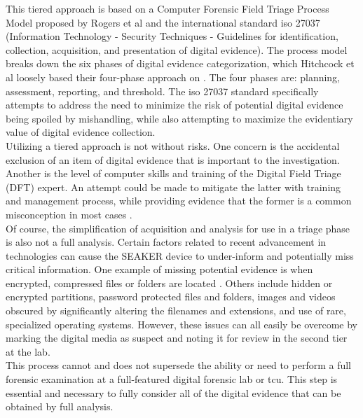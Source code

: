 \documentclass[12pt]{article}
\begin{document}
This tiered approach is based on a Computer Forensic Field Triage Process Model proposed
by Rogers et al \cite{rogers2006computer} and the international standard \gls{iso} 27037
(Information Technology - Security Techniques - Guidelines for identification, collection,
acquisition, and presentation of digital evidence). The process model breaks down the six
phases of digital evidence categorization, which Hitchcock et al
loosely based their four-phase approach on \cite{hitchcock2016tiered}.  The four phases are: planning, assessment,
reporting, and threshold.  The \gls{iso} 27037 standard specifically attempts to address the need
to minimize the risk of potential digital evidence being spoiled by mishandling, while also
attempting to maximize the evidentiary value of digital evidence collection.\\

Utilizing a tiered approach is not without risks.  One concern is the accidental exclusion
of an item of digital evidence that is important to the investigation.  Another is the
level of computer skills and training of the Digital Field Triage (DFT) expert.  An attempt
could be made to mitigate the latter with training and management process, while providing
evidence that the former is a common misconception in most cases \cite{rogers2006computer}.\\

Of course, the simplification of acquisition and analysis for use in a triage phase is also
not a full analysis. Certain factors related to recent advancement in technologies can cause
the SEAKER device to under-inform and potentially miss critical information.  One
example of missing potential evidence is when encrypted, compressed files or folders
are located \cite{shaw2013practical}.  Others include hidden or encrypted partitions,
password protected files and folders, images and videos obscured by significantly altering
the filenames and extensions, and use of rare, specialized operating systems. However,
these issues can all easily be overcome by marking the digital media as suspect and noting
it for review in the second tier at the lab.\\

This process cannot and does not supersede the ability or need to perform a full forensic
examination at a full-featured digital forensic lab \cite{rogers2006computer} or \gls{tcu}.  This
step is essential and necessary to fully consider all of the digital evidence that can
be obtained by full analysis.\\
\end{document}
